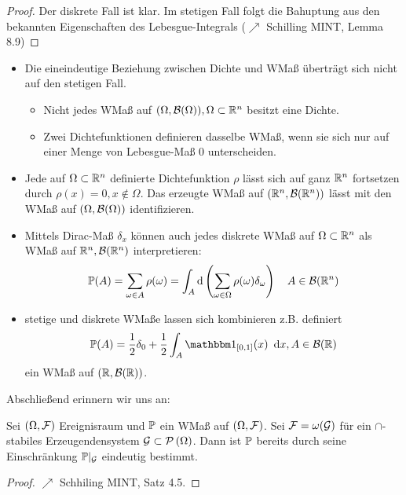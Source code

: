 \begin{proof}
    Der diskrete Fall ist klar.
    Im stetigen Fall folgt die Bahuptung aus den bekannten Eigenschaften des Lebesgue-Integrals ($\nearrow$ Schilling MINT, Lemma 8.9)
\end{proof}

\begin{*bemerkung}
    \begin{itemize}[leftmargin=*, nolistsep]
        \item Die eineindeutige Beziehung zwischen Dichte und WMaß überträgt sich nicht auf den stetigen Fall.
        \begin{itemize}[nolistsep]
            \item Nicht jedes WMaß auf $(\Omega, \borel{\Omega}), \Omega \subset \Rn$ besitzt eine Dichte.
            \item Zwei Dichtefunktionen definieren dasselbe WMaß, wenn sie sich nur auf einer Menge von Lebesgue-Maß $0$ unterscheiden.
        \end{itemize}
        \item Jede auf $\Omega \subset \Rn$ definierte Dichtefunktion $\rho$ lässt sich auf ganz $\Rn$ fortsetzen durch $\rho(x) = 0, x \notin \Omega$. Das erzeugte WMaß auf $(\Rn, \borel{\Rn})$ lässt mit den WMaß auf $(\Omega, \borel{\Omega})$ identifizieren.
        \item Mittels Dirac-Maß $\delta_{x}$ können auch jedes diskrete WMaß auf $\Omega \subset \Rn$ als WMaß auf $\Rn, \borel{\Rn}$ interpretieren:
        \begin{equation*}
            \P(A) = \sum_{\omega \in A} \rho(\omega) = \int_{A} \mathrm{d} \left( \sum_{\omega \in \Omega} \rho(\omega)\delta_{\omega} \right) \quad A \in \borel{\Rn}
        \end{equation*}
        \item stetige und diskrete WMaße lassen sich kombinieren z.B. definiert
        \begin{equation*}
            \P(A) = \frac{1}{2} \delta_{0} + \frac{1}{2} \int_{A} \one_{[0,1]}(x) \dx, A \in \borel{\R}
        \end{equation*}
        ein WMaß auf $(\R, \borel{\R})$.
    \end{itemize}
\end{*bemerkung}

Abschließend erinnern wir uns an:

\begin{satz}
    Sei $(\Omega, \ereignisF)$ Ereignisraum und $\P$ ein WMaß auf $(\Omega, \ereignisF)$. 
    Sei $\ereignisF = \omega(\mathcal{G})$ für ein $\cap$-stabiles Erzeugendensystem $\mathcal{G} \subset \pows{\Omega}$. 
    Dann ist $\P$ bereits durch seine Einschränkung $\P |_{\mathcal{G}}$ eindeutig bestimmt.
\end{satz}
\begin{proof}
    $\nearrow$ Schhiling MINT, Satz 4.5.
\end{proof}

